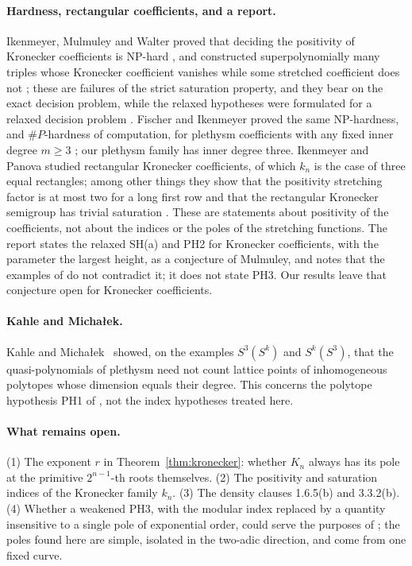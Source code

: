 \documentclass[11pt,a4paper]{article}
\theoremstyle{definition}
\begin{document}
\paragraph{Hardness, rectangular coefficients, and a report.}
Ikenmeyer, Mulmuley and Walter proved that deciding the positivity of Kronecker
coefficients is NP-hard \cite[Theorem 1.3, p.~7]{IMW}, and constructed
superpolynomially many triples whose Kronecker coefficient vanishes while some
stretched coefficient does not \cite[Theorem 1.7, p.~11]{IMW}; these are
failures of the strict saturation property, and they bear on the exact decision
problem, while the relaxed hypotheses were formulated for a relaxed decision
problem \cite[Theorem 3.3.6, p.~52]{GCT6}. Fischer and Ikenmeyer proved the
same NP-hardness, and $\#P$-hardness of computation, for plethysm coefficients
with any fixed inner degree $m\ge3$ \cite[Theorems 3.1 and 3.2, p.~5]{FI}; our
plethysm family has inner degree three. Ikenmeyer and Panova studied
rectangular Kronecker coefficients, of which $k_n$ is the case of three equal
rectangles; among other things they show that the positivity stretching
factor is at most two for a long first row and that the rectangular Kronecker
semigroup has trivial saturation \cite[Section 5(c),(d), p.~13]{IP}. These are
statements about positivity of the coefficients, not about the indices or the
poles of the stretching functions. The report \cite[Conjecture 3, p.~3]{ICERM}
states the relaxed SH(a) and PH2 for Kronecker coefficients, with the parameter
the largest height, as a conjecture of Mulmuley, and notes that the examples of
\cite{BOR} do not contradict it; it does not state PH3. Our results leave that
conjecture open for Kronecker coefficients.

\paragraph{Kahle and Micha\l{}ek.}
Kahle and Micha\l{}ek~\cite{KM} showed, on the examples $S^3(S^k)$ and
$S^k(S^3)$, that the quasi-polynomials of plethysm need not count lattice points
of inhomogeneous polytopes whose dimension equals their degree. This concerns
the polytope hypothesis PH1 of \cite{GCT6}, not the index hypotheses treated
here.

\paragraph{What remains open.}
(1) The exponent $r$ in Theorem~\ref{thm:kronecker}: whether $K_n$ always has
its pole at the primitive $2^{n-1}$-th roots themselves. (2) The positivity and
saturation indices of the Kronecker family $k_n$. (3) The density clauses
1.6.5(b) and 3.3.2(b). (4) Whether a weakened PH3, with the modular index
replaced by a quantity insensitive to a single pole of exponential order, could
serve the purposes of \cite{GCT6}; the poles found here are simple, isolated in
the two-adic direction, and come from one fixed curve.
\end{document}
